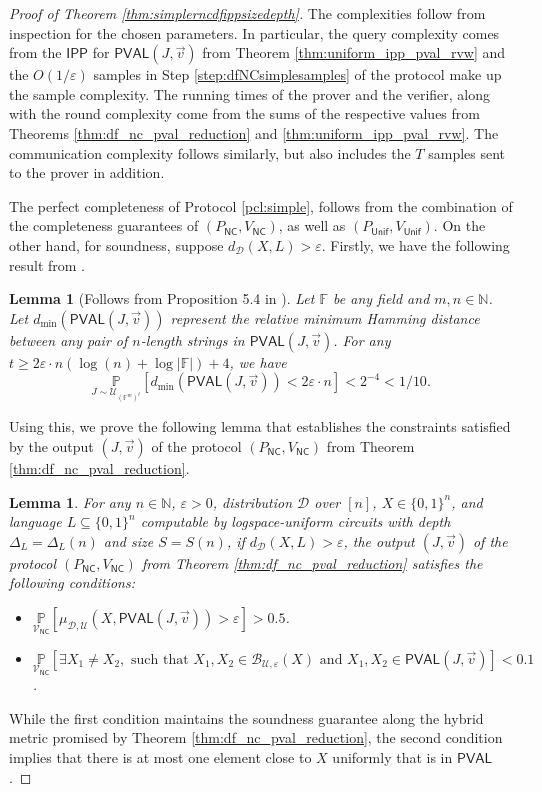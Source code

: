 \documentclass[10pt,a4paper]{article}
\newtheorem{lemma}[theorem]{Lemma}
\newcommand{\NC}{\mathsf{NC}}
\newcommand{\PVAL}{\mathsf{PVAL}}
\newcommand{\IPP}{\mathsf{IPP}}
\newcommand{\F}{\mathbb{F}}
\newcommand{\N}{\mathbb{N}}
\newcommand{\sU}{\mathcal{U}}
\newcommand{\sD}{\mathcal{D}}
\newcommand{\sB}{\mathcal{B}}
\begin{document}
\begin{proof}[Proof of Theorem \ref{thm:simplerncdfippsizedepth}]
The complexities follow from inspection for the chosen parameters. In particular, the query complexity comes from the $\IPP$ for $\PVAL(J,\vec{v})$ from Theorem \ref{thm:uniform_ipp_pval_rvw} and the $O(1/\varepsilon)$ samples in Step \ref{step:dfNCsimplesamples} of the protocol make up the sample complexity. The running times of the prover and the verifier, along with the round complexity come from the sums of the respective values from Theorems \ref{thm:df_nc_pval_reduction} and \ref{thm:uniform_ipp_pval_rvw}. The communication complexity follows similarly, but also includes the $T$ samples sent to the prover in addition.

The perfect completeness of Protocol \ref{pcl:simple}, follows from the combination of the completeness guarantees of $(P_{\NC}, V_{\NC})$, as well as $(P_{\mathsf{Unif}}, V_{\mathsf{Unif}})$. On the other hand, for soundness, suppose $d_{\sD}(X,L)>\varepsilon$. Firstly, we have the following result from \cite{RR20_batch_polylog}.
\begin{lemma}[Follows from Proposition 5.4 in \cite{RR20_batch_polylog}]
\label{lem:rr20_min_dist_random_pval}
Let $\F$ be any field and $m,n\in \N$. Let $d_{\min}(\PVAL(J,\Vec{v}))$ represent the relative minimum Hamming distance between any pair of $n$-length strings in $\PVAL(J,\Vec{v})$. For any $t \geq 2\varepsilon\cdot n (\log (n)+\log |\F|)+4$, we have
\begin{equation*}
    \underset{J\sim \sU_{(\F^{m})^{t}}}{\mathbb{P}}[d_{\min}(\PVAL(J,\vec{v}))<2\varepsilon \cdot n]<2^{-4}<1/10.
\end{equation*}
\end{lemma}

Using this, we prove the following lemma that establishes the constraints satisfied by the output $(J,\Vec{v})$ of the protocol $(P_\NC, V_\NC)$ from Theorem \ref{thm:df_nc_pval_reduction}. 
\begin{lemma}
\label{lem:PVALasaCodeSoundness}
For any $n\in\mathbb{N}$, $\varepsilon>0$, distribution $\sD$ over $[n]$, $X\in\{0,1\}^{n}$, and language $L\subseteq \{0,1\}^{n}$ computable by logspace-uniform  circuits with depth $\Delta_{L}=\Delta_{L}(n)$ and size $S=S(n)$, if $d_{\sD}(X,L)>\varepsilon$, the output $(J,\vec{v})$ of the protocol $(P_\NC,V_\NC)$ from Theorem \ref{thm:df_nc_pval_reduction} satisfies the following conditions:
\begin{itemize}
    \item $\underset{\mathcal{V}_{\NC}}{\mathbb{P}}[\mu_{\sD,\mathcal{U}}(X,\PVAL(J,\vec{v}))>\varepsilon]>0.5$.
    \item $\underset{\mathcal{V}_{\NC}}{\mathbb{P}}[\exists X_1 \neq X_2, \text{ such that } X_1, X_2 \in \sB_{\sU,\varepsilon}(X) \text{ and } X_{1},X_{2} \in \PVAL(J,\vec{v})] < 0.1$.
\end{itemize}
\end{lemma}
While the first condition maintains the soundness guarantee along the hybrid metric promised by Theorem \ref{thm:df_nc_pval_reduction}, the second condition implies that there is at most one element close to $X$ uniformly that is in $\PVAL$. 



\end{proof}
\end{document}
